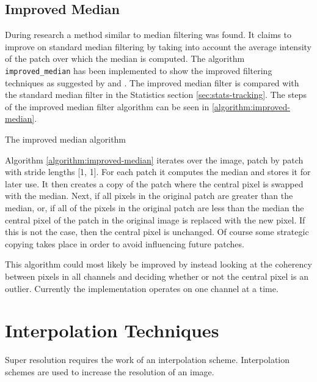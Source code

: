 \documentclass{article}
\begin{document}
\subsection{Improved Median}
\label{subsec:improved-median}
%
During research a method similar to median filtering was found. It
claims to improve on standard median filtering by taking into account
the average intensity of the patch over which the median is
computed. The algorithm \texttt{improved\_median} has been implemented
to show the improved filtering techniques as suggested by
\cite{improved-median} and \cite{Med2012}. The improved median filter
is compared with the standard median filter in the Statistics section
\ref{sec:stats-tracking}. The steps of the improved median filter
algorithm can be seen in \ref{algorithm:improved-median}. \par
%
\begin{algorithm}[t]
  \caption{The improved median algorithm}
  \label{algorithm:improved-median}
\end{algorithm}
%
Algorithm \ref{algorithm:improved-median} iterates over the image,
patch by patch with stride lengths [1, 1]. For each patch it computes
the median and stores it for later use. It then creates a copy of the
patch where the central pixel is swapped with the median. Next, if all
pixels in the original patch are greater than the median, or, if all
of the pixels in the original patch are less than the median the
central pixel of the patch in the original image is replaced with the
new pixel. If this is not the case, then the central pixel is
unchanged. Of course some strategic copying takes place in order to
avoid influencing future patches.\par
%
This algorithm could most likely be
improved by instead looking at the coherency between pixels in all
channels and deciding whether or not the central pixel is an
outlier. Currently the implementation operates on one channel at a
time.
%
\section{Interpolation Techniques}
\label{sec:interp-techs}
Super resolution requires the work of an interpolation
scheme. Interpolation schemes are used to increase the resolution of
an image.
\end{document}
